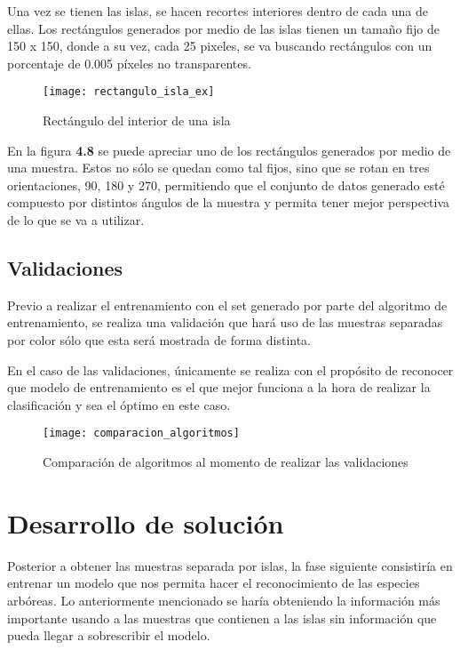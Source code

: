 \break

Una vez se tienen las islas, se hacen recortes interiores dentro de cada una de ellas. Los rectángulos generados por medio de las islas tienen un tamaño fijo de 150 x 150, donde a su vez, cada 25 pixeles, se va buscando rectángulos con un porcentaje de 0.005 píxeles no transparentes.


\begin{figure}[h]
  \centering
  \begin{minipage}[b]{0.7\textwidth}
        \texttt{[image: rectangulo\_isla\_ex]}
    \caption{Rectángulo del interior de una isla}
  \end{minipage}
\end{figure}


En la figura \textbf{4.8} se puede apreciar uno de los rectángulos generados por medio de una muestra. Estos no sólo se quedan como tal fijos, sino que se rotan en tres orientaciones, 90, 180 y 270, permitiendo que el conjunto de datos generado esté compuesto por distintos ángulos de la muestra y permita tener mejor perspectiva de lo que se va a utilizar.

\break

\section{Validaciones}

Previo a realizar el entrenamiento con el set generado por parte del algoritmo de entrenamiento, se realiza una validación que hará uso de las muestras separadas por color sólo que esta será mostrada de forma distinta.

En el caso de las validaciones, únicamente se realiza con el propósito de reconocer que modelo de entrenamiento es el que mejor funciona a la hora de realizar la clasificación y sea el óptimo en este caso. \\


\begin{figure}[h]
 \centering
\texttt{[image: comparacion\_algoritmos]}
\caption{Comparación de algoritmos al momento de realizar las validaciones}
\end{figure}

\break

\chapter{Desarrollo de solución}

Posterior a obtener las muestras separada por islas, la fase siguiente consistiría en entrenar un modelo que nos permita hacer el reconocimiento de las especies arbóreas. Lo anteriormente mencionado se haría obteniendo la información más importante usando a las muestras que contienen a las islas sin información que pueda llegar a sobrescribir el modelo.

